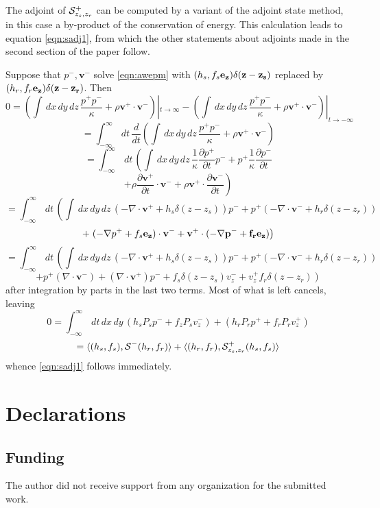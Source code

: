 \documentclass[georeport,12pt]{geophysics}
\newcommand{\bv}{\mathbf{v}}
\begin{document}

The adjoint of ${\cal S}^+_{z_s,z_r}$ can be computed by a variant of
the adjoint state method, in this case a by-product of the
conservation of energy. This calculation leads to equation
\ref{eqn:sadj1}, from which the other statements about adjoints made in the second
section of the paper follow.

Suppose that $p^-,\bv^-$ solve \ref{eqn:awepm}
with $(h_s,f_s\bf{e}_z)\delta(z-z_s)$ replaced by
$ (h_r,f_r\bf{e}_z) \delta(z-z_r)$. Then
\[
0 = 
\left(\int\, dx\,dy\,dz\, \frac{p^+ p^-}{\kappa} +  
\rho \bv^+ \cdot \bv^- \right)|_{t \rightarrow \infty}
-
\left(\int\, dx\,dy\,dz\, \frac{p^+ p^-}{\kappa} +  \rho \bv^+ \cdot \bv^- \right)|_{t \rightarrow -\infty}
\]
\[
= 
\int_{-\infty}^{\infty} \,dt\, \frac{d}{dt}\left(\int\, dx\,dy\,dz\, \frac{p^+ p^-}{\kappa} +  \rho \bv^+ \cdot \bv^- \right)
\]
\[
= 
\int_{-\infty}^{\infty} \,dt\, \left(\int\, dx\,dy\,dz\, \frac{1}{\kappa} \frac{\partial p^+}{\partial t} p^- +  p^+ \frac{1}{\kappa}\frac{\partial p^-}{\partial t} \right.
\]
\[
+
\left. \rho \frac{\partial \bv^+}{\partial t} \cdot \bv^- + \rho \bv^+ \cdot \frac{\partial \bv^-}{\partial t} \right)
\]
\[
= 
\int_{-\infty}^{\infty} \,dt\, \left(\int\, dx\,dy\,dz\, \left(- \nabla \cdot \bv^+ + 
 h_s \delta(z-z_s)\right) p^- + p^+ \left(- \nabla \cdot \bv^- + 
 h_r \delta(z-z_r)\right) \right.
\]
\[
+
\left.  (- \nabla p^++f_s\bf{e}_z) \cdot \bv^- + \bv^+ \cdot (-\nabla
  p^- + f_r \bf{e_z}) \right)
\]
\[
= 
\int_{-\infty}^{\infty}\,dt\, \left(\int\, dx\,dy\,dz\, \left(- \nabla \cdot \bv^+ + 
 h_s \delta(z-z_s)\right) p^- + p^+ \left(- \nabla \cdot \bv^- + 
 h_r \delta(z-z_r)\right) \right.
\]
\[
+
\left.  p^+ (\nabla \cdot \bv^-) + (\nabla \cdot \bv^+) p^- 
  +f_s \delta(z-z_s) v_z^- + v_z^+f_r \delta(z-z_r) \right)
\]
after integration by parts in the last two terms. Most of what is left cancels, leaving 
\[
0 = \int_{-\infty}^{\infty}\,dt\,dx\,dy\, (h_sP_sp^-+f_zP_sv_z^-) +
( h_rP_rp^++f_rP_rv_z^+)
\]
\[
  = \langle (h_s,f_s), {\cal S}^-(h_r,f_r) \rangle+ \langle (h_r,f_r), {\cal S}^+_{z_s,z_r}(h_s,f_s) \rangle
\]
whence \ref{eqn:sadj1} follows immediately.


\section{Declarations}
\subsection{Funding}
The author did not receive support from any organization for the
submitted work.
\end{document}
